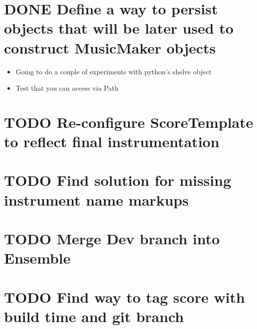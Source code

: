 \documentclass[11pt]{article}
\begin{document}
\section*{{\bfseries\sffamily DONE} Define a way to persist objects that will be later used to construct MusicMaker objects}
\label{sec:org444c069}
\begin{itemize}
\item Going to do a couple of experiments with python's shelve object

\item Test that you can access via Path
\end{itemize}

\section*{{\bfseries\sffamily TODO} Re-configure ScoreTemplate to reflect final instrumentation}
\label{sec:org844d776}
\section*{{\bfseries\sffamily TODO} Find solution for missing instrument name markups}
\label{sec:org31af4fc}
\section*{{\bfseries\sffamily TODO} Merge Dev branch into Ensemble}
\label{sec:org5ff3713}

\section*{{\bfseries\sffamily TODO} Find way to tag score with build time and git branch}
\label{sec:org21e4c0f}
\end{document}

